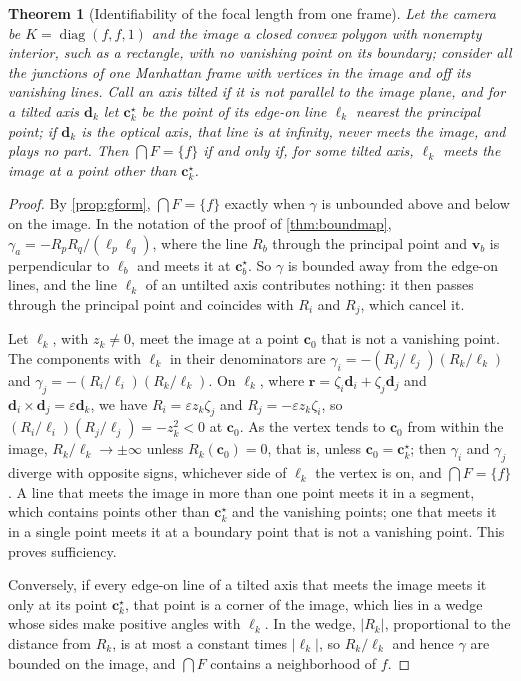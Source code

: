 \documentclass[pdflatex,sn-mathphys-num,iicol]{sn-jnl}
\newcommand{\vd}{\mathbf{d}}
\newcommand{\vr}{\mathbf{r}}
\newcommand{\vc}{\mathbf{c}}
\newcommand{\vv}{\mathbf{v}}
\theoremstyle{thmstyleone}
\newtheorem{theorem}{Theorem}
\theoremstyle{thmstylethree}
\theoremstyle{thmstyletwo}
\begin{document}
\begin{theorem}[Identifiability of the focal length from one frame]\label{thm:identframe}
Let the camera be $K=\operatorname{diag}(f,f,1)$ and the image a closed convex polygon with nonempty interior, such as a rectangle, with no vanishing point on its boundary; consider all the junctions of one Manhattan frame with vertices in the image and off its vanishing lines. Call an axis \emph{tilted} if it is not parallel to the image plane, and for a tilted axis $\vd_k$ let $\vc^{\star}_k$ be the point of its edge-on line $\ell_k$ nearest the principal point; if $\vd_k$ is the optical axis, that line is at infinity, never meets the image, and plays no part. Then $\bigcap F=\{f\}$ if and only if, for some tilted axis, $\ell_k$ meets the image at a point other than $\vc^{\star}_k$.
\end{theorem}
\begin{proof}
By \cref{prop:gform}, $\bigcap F=\{f\}$ exactly when $\gamma$ is unbounded above and below on the image. In the notation of the proof of \cref{thm:boundmap}, $\gamma_a=-R_pR_q/(\ell_p\ell_q)$, where the line $R_b$ through the principal point and $\vv_b$ is perpendicular to $\ell_b$ and meets it at $\vc^{\star}_b$. So $\gamma$ is bounded away from the edge-on lines, and the line $\ell_k$ of an untilted axis contributes nothing: it then passes through the principal point and coincides with $R_i$ and $R_j$, which cancel it.

Let $\ell_k$, with $z_k\neq0$, meet the image at a point $\vc_0$ that is not a vanishing point. The components with $\ell_k$ in their denominators are $\gamma_i=-(R_j/\ell_j)(R_k/\ell_k)$ and $\gamma_j=-(R_i/\ell_i)(R_k/\ell_k)$. On $\ell_k$, where $\vr=\zeta_i\vd_i+\zeta_j\vd_j$ and $\vd_i\times\vd_j=\varepsilon\vd_k$, we have $R_i=\varepsilon z_k\zeta_j$ and $R_j=-\varepsilon z_k\zeta_i$, so $(R_i/\ell_i)(R_j/\ell_j)=-z_k^2<0$ at $\vc_0$. As the vertex tends to $\vc_0$ from within the image, $R_k/\ell_k\to\pm\infty$ unless $R_k(\vc_0)=0$, that is, unless $\vc_0=\vc^{\star}_k$; then $\gamma_i$ and $\gamma_j$ diverge with opposite signs, whichever side of $\ell_k$ the vertex is on, and $\bigcap F=\{f\}$. A line that meets the image in more than one point meets it in a segment, which contains points other than $\vc^{\star}_k$ and the vanishing points; one that meets it in a single point meets it at a boundary point that is not a vanishing point. This proves sufficiency.

Conversely, if every edge-on line of a tilted axis that meets the image meets it only at its point $\vc^{\star}_k$, that point is a corner of the image, which lies in a wedge whose sides make positive angles with $\ell_k$. In the wedge, $|R_k|$, proportional to the distance from $R_k$, is at most a constant times $|\ell_k|$, so $R_k/\ell_k$ and hence $\gamma$ are bounded on the image, and $\bigcap F$ contains a neighborhood of $f$.
\end{proof}
\end{document}
